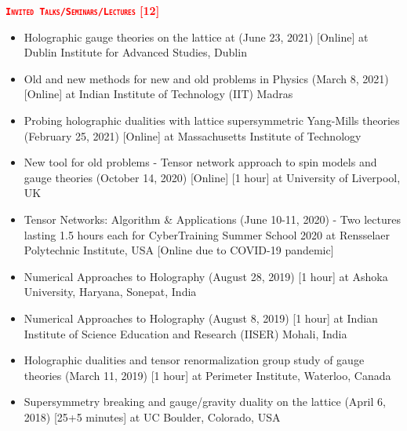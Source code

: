 \renewcommand\ttdefault{cmvtt}
\textcolor{red}{\textbf{\textsc{\fontsize{11}{48} \bfseries \texttt{Invited Talks/Seminars/Lectures} [12]}}}

\begin{itemize}
 \item Holographic gauge theories on the lattice at 
 (June 23, 2021) [Online] at Dublin Institute for Advanced Studies, Dublin
 \href{https://rgjha.github.io/talks/DIAS_230621.pdf}{{\texttt{}}} 
 \item Old and new methods for new and old problems in Physics
 (March 8, 2021) [Online] at Indian Institute of Technology (IIT) Madras
 \href{https://rgjha.github.io/talks/Collo_IITM.pdf}{{\texttt{}}} 
 \item Probing holographic dualities with lattice supersymmetric Yang-Mills theories 
 (February 25, 2021) [Online] at Massachusetts Institute of Technology
 \href{https://rgjha.github.io/talks/MIT_v2.pdf}{{\texttt{}}} 
 \href{http://y2u.be/fO8A18uwYIM}{{\texttt{}}}
 \item New tool for old problems - Tensor network approach to spin models and gauge theories 
 (October 14, 2020) [Online] [1 hour] at University of Liverpool, UK
 \href{https://rgjha.github.io/talks/Seminar_v2.pdf}{{\texttt{}}} 
 \item Tensor Networks: Algorithm \& Applications (June 10-11, 2020) - Two lectures lasting 1.5 hours each for 
 CyberTraining Summer School 2020 at Rensselaer Polytechnic Institute, USA [Online due to COVID-19 pandemic] 
 \href{https://rgjha.github.io/talks/cs2020.pdf}{{\texttt{\COL{[Lecture 1 \& 2]}}}} 
 \item Numerical Approaches to Holography (August 28, 2019) [1 hour] at Ashoka University, Haryana, Sonepat, India
 \href{https://rgjha.github.io/talks/Talk_v1.pdf}{{\texttt{}}} 
 \item Numerical Approaches to Holography (August 8, 2019) [1 hour] at Indian Institute of Science Education and Research (IISER) Mohali, India
  \item Holographic dualities and tensor renormalization group study of gauge theories (March 11, 2019) [1 hour] at Perimeter Institute, Waterloo, Canada 
  \href{http://www.perimeterinstitute.ca/videos/interdisciplinary-seminar-holographic-dualities-and-tensor-renormalization-group-study-gauge}
{{\texttt{}}} 
  \item Supersymmetry breaking and gauge/gravity duality on the lattice (April 6, 2018) [25+5 minutes] at UC Boulder, Colorado, USA \href{https://rgjha.github.io/talks/lbsm18_jha.pdf}{{\texttt{}}} 

\end{itemize}
